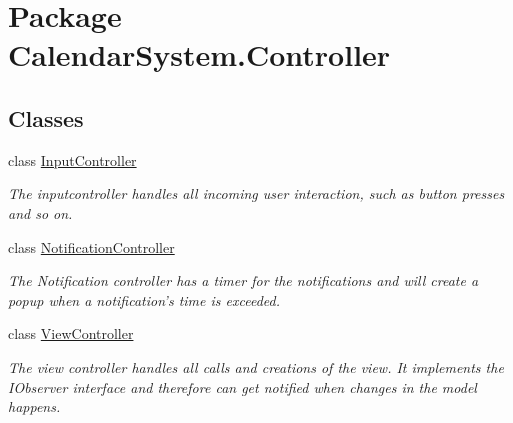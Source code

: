 \hypertarget{namespace_calendar_system_1_1_controller}{\section{Package Calendar\+System.\+Controller}
\label{namespace_calendar_system_1_1_controller}
}
\subsection*{Classes}
\begin{DoxyCompactItemize}
\item 
class \hyperlink{class_calendar_system_1_1_controller_1_1_input_controller}{Input\+Controller}
\begin{DoxyCompactList}\small\item\em The inputcontroller handles all incoming user interaction, such as button presses and so on. \end{DoxyCompactList}\item 
class \hyperlink{class_calendar_system_1_1_controller_1_1_notification_controller}{Notification\+Controller}
\begin{DoxyCompactList}\small\item\em The Notification controller has a timer for the notifications and will create a popup when a notification's time is exceeded. \end{DoxyCompactList}\item 
class \hyperlink{class_calendar_system_1_1_controller_1_1_view_controller}{View\+Controller}
\begin{DoxyCompactList}\small\item\em The view controller handles all calls and creations of the view. It implements the I\+Observer interface and therefore can get notified when changes in the model happens. \end{DoxyCompactList}\end{DoxyCompactItemize}
